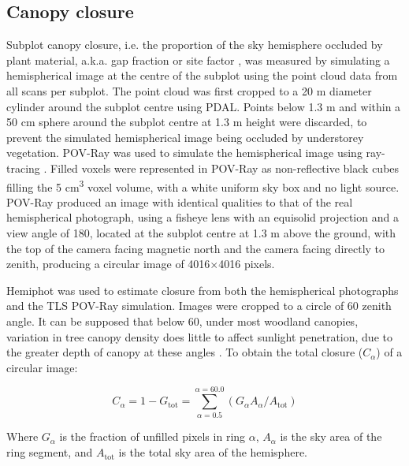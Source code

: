 \begin{refsection}
\subsection{Canopy closure}

Subplot canopy closure, i.e. the proportion of the sky hemisphere occluded by plant material, a.k.a. gap fraction or site factor \citep{Jennings1999}, was measured by simulating a hemispherical image at the centre of the subplot using the point cloud data from all scans per subplot. The point cloud was first cropped to a 20 m diameter cylinder around the subplot centre using PDAL. Points below 1.3 m and within a 50 cm sphere around the subplot centre at 1.3 m height were discarded, to prevent the simulated hemispherical image being occluded by understorey vegetation. POV-Ray was used to simulate the hemispherical image using ray-tracing \citep{Povray2004}. Filled voxels were represented in POV-Ray as non-reflective black cubes filling the 5 cm\textsuperscript{3} voxel volume, with a white uniform sky box and no light source. POV-Ray produced an image with identical qualities to that of the real hemispherical photograph, using a fisheye lens with an equisolid projection and a view angle of 180\textdegree, located at the subplot centre at 1.3 m above the ground, with the top of the camera facing magnetic north and the camera facing directly to zenith, producing a circular image of 4016$\times$4016 pixels.

Hemiphot \citep{HemiPhot} was used to estimate closure from both the hemispherical photographs and the TLS POV-Ray simulation. Images were cropped to a circle of 60\textdegree{} zenith angle. It can be supposed that below 60\textdegree{}, under most woodland canopies, variation in tree canopy density does little to affect sunlight penetration, due to the greater depth of canopy at these angles \citep{Jupp2008}. To obtain the total closure ($C_{\alpha{}}$) of a circular image:

\begin{equation}
	C_{\alpha{}} = 1 - G_{\text{tot}} = \sum_{\alpha{} = 0.5}^{\alpha{} = 60.0}(G_{\alpha{}} A_{\alpha{}} / A_{\text{tot}})
\end{equation}

Where $G_{\alpha{}}$ is the fraction of unfilled pixels in ring $\alpha{}$, $A_{\alpha{}}$ is the sky area of the ring segment, and $A_{\text{tot}}$ is the total sky area of the hemisphere.


\end{refsection}
